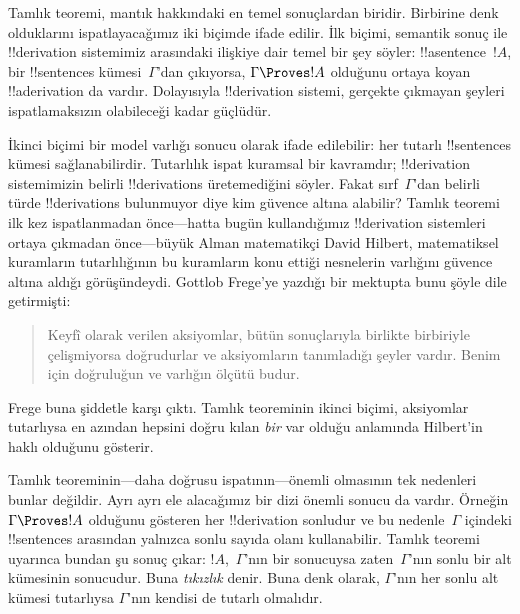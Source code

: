 

      {}
      {}


Tamlık teoremi, mantık hakkındaki en temel sonuçlardan biridir.
Birbirine denk olduklarını ispatlayacağımız iki biçimde ifade edilir.
İlk biçimi, semantik sonuç ile !!{derivation} sistemimiz arasındaki
ilişkiye dair temel bir şey söyler: !!a{sentence}~$!A$, bir
!!{sentence}s kümesi~$\Gamma$'dan çıkıyorsa, $\Gamma \Proves !A$
olduğunu ortaya koyan !!a{derivation} da vardır. Dolayısıyla
!!{derivation} sistemi, gerçekte çıkmayan şeyleri ispatlamaksızın
olabileceği kadar güçlüdür.

İkinci biçimi bir model varlığı sonucu olarak ifade edilebilir: her
tutarlı !!{sentence}s kümesi sağlanabilirdir. Tutarlılık ispat
kuramsal bir kavramdır; !!{derivation} sistemimizin belirli
!!{derivation}s üretemediğini söyler. Fakat sırf~$\Gamma$'dan belirli
türde !!{derivation}s bulunmuyor diye
 kim güvence altına
alabilir? Tamlık teoremi ilk kez ispatlanmadan önce---hatta bugün
kullandığımız !!{derivation} sistemleri ortaya çıkmadan önce---büyük
Alman matematikçi David Hilbert, matematiksel kuramların tutarlılığının
bu kuramların konu ettiği nesnelerin varlığını güvence altına aldığı
görüşündeydi. Gottlob Frege'ye yazdığı bir mektupta bunu şöyle dile
getirmişti:
\begin{quote}
  Keyfî olarak verilen aksiyomlar, bütün sonuçlarıyla birlikte birbiriyle
  çelişmiyorsa doğrudurlar ve aksiyomların tanımladığı şeyler vardır. Benim
  için doğruluğun ve varlığın ölçütü budur.
\end{quote}
Frege buna şiddetle karşı çıktı. Tamlık teoreminin ikinci biçimi,
aksiyomlar tutarlıysa en azından hepsini doğru kılan \emph{bir}
 var olduğu anlamında
Hilbert'in haklı olduğunu gösterir.

Tamlık teoreminin---daha doğrusu ispatının---önemli olmasının tek
nedenleri bunlar değildir. Ayrı ayrı ele alacağımız bir dizi önemli
sonucu da vardır. Örneğin $\Gamma \Proves !A$ olduğunu gösteren her
!!{derivation} sonludur ve bu nedenle~$\Gamma$ içindeki
!!{sentence}s arasından yalnızca sonlu sayıda olanı kullanabilir.
Tamlık teoremi uyarınca bundan şu sonuç çıkar: $!A$,~$\Gamma$'nın bir
sonucuysa zaten~$\Gamma$'nın sonlu bir alt kümesinin sonucudur. Buna
\emph{tıkızlık} denir. Buna denk olarak, $\Gamma$'nın her sonlu alt
kümesi tutarlıysa $\Gamma$'nın kendisi de tutarlı olmalıdır.

